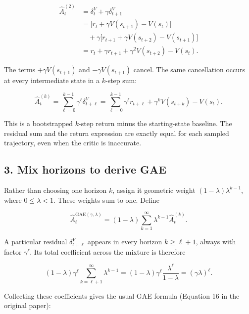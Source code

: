 \documentclass[11pt, a4paper]{article}
\begin{document}
\begin{align}
    \hat A_t^{(2)}
    &=\delta_t^V+\gamma\delta_{t+1}^V\nonumber\\
    &=\big[r_t+\gamma V(s_{t+1})-V(s_t)\big]\nonumber\\
    &\quad+\gamma\big[r_{t+1}+\gamma V(s_{t+2})-V(s_{t+1})\big]\nonumber\\
    &=r_t+\gamma r_{t+1}+\gamma^2V(s_{t+2})-V(s_t).
    \label{eq:ppo-gae-two-step}
\end{align}

The terms $+\gamma V(s_{t+1})$ and $-\gamma V(s_{t+1})$ cancel. The same cancellation occurs at every intermediate state in a $k$-step sum:

\begin{equation}\label{eq:ppo-gae-k-step}
    \hat A_t^{(k)}
    =\sum_{\ell=0}^{k-1}\gamma^\ell\delta_{t+\ell}^V
    =\sum_{\ell=0}^{k-1}\gamma^\ell r_{t+\ell}
      +\gamma^kV(s_{t+k})-V(s_t).
\end{equation}

This is a bootstrapped $k$-step return minus the starting-state baseline. The residual sum and the return expression are exactly equal for each sampled trajectory, even when the critic is inaccurate.

\subsection*{3. Mix horizons to derive GAE}

Rather than choosing one horizon $k$, assign it geometric weight $(1-\lambda)\lambda^{k-1}$, where $0\le\lambda<1$. These weights sum to one. Define

\begin{equation}\label{eq:ppo-gae-geometric-mixture}
    \hat A_t^{\mathrm{GAE}(\gamma,\lambda)}
    =(1-\lambda)\sum_{k=1}^{\infty}\lambda^{k-1}\hat A_t^{(k)}.
\end{equation}

A particular residual $\delta_{t+\ell}^V$ appears in every horizon $k\ge\ell+1$, always with factor $\gamma^\ell$. Its total coefficient across the mixture is therefore

\begin{equation}\label{eq:ppo-gae-residual-weight}
    (1-\lambda)\gamma^\ell\sum_{k=\ell+1}^{\infty}\lambda^{k-1}
    =(1-\lambda)\gamma^\ell\frac{\lambda^\ell}{1-\lambda}
    =(\gamma\lambda)^\ell.
\end{equation}

Collecting these coefficients gives the usual GAE formula (Equation 16 in the original paper):
\end{document}
